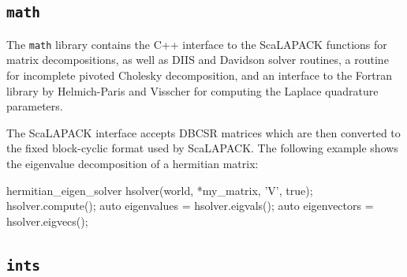 \subsection{\texttt{math}}

The \texttt{math} library contains the C++ interface to the ScaLAPACK functions for matrix decompositions, as well as DIIS and Davidson solver routines, a routine for incomplete pivoted Cholesky decomposition, and an interface to the Fortran library by Helmich-Paris and Visscher \cite{Hel2016} for computing the Laplace quadrature parameters. 

The ScaLAPACK interface accepts DBCSR matrices which are then converted to the fixed block-cyclic format used by ScaLAPACK. The following example shows the eigenvalue decomposition of a hermitian matrix:
\begin{cppinline}
hermitian_eigen_solver hsolver(world, *my_matrix, 'V', true);
hsolver.compute();
auto eigenvalues = hsolver.eigvals();
auto eigenvectors = hsolver.eigvecs();
\end{cppinline} 

\subsection{\texttt{ints}}

